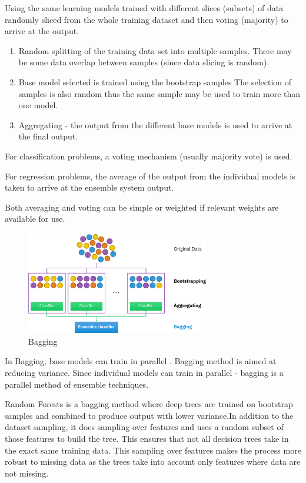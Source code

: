\documentclass{article}
\begin{document}
Using the same learning models trained with different slices (subsets) of data randomly sliced from the whole training dataset and then voting (majority) to arrive at the output.


\begin{enumerate}
    \item Random splitting of the training data set into multiple samples. 
    There may be some data overlap between samples (since data slicing is random).
    \item Base model selected is trained using the bootstrap samples
    The selection of samples is also random thus the same sample may be used to train more than one model.
    \item Aggregating - the output from the different base models is used to arrive at the final output.
\end{enumerate}

For classification problems, a voting mechanism (usually majority vote) is used. 

For regression problems, the average of the output from the individual models is taken to arrive at the ensemble system output.

Both averaging and voting can be simple or weighted if relevant weights are available for use. 



\begin{figure}[H]
    \centering
    \includegraphics[width=8cm]{report-imgs/Ensemble_Bagging.png}
    \caption{Bagging \cite{wiki:bagging}}
    \label{bagging}
\end{figure}

In Bagging, base models can train in parallel \cite{rocca_2021}. Bagging method is aimed at reducing variance. Since individual models can train in parallel - bagging is a parallel method of ensemble techniques.


Random Forests is a bagging method where deep trees are trained on bootstrap samples and combined to produce output with lower variance.In addition to the dataset sampling, it does sampling over features and uses a random subset of those features to build the tree. This ensures that not all decision trees take in the exact same training data. This sampling over features makes the process more robust to missing data as the trees take into account only features where data are not missing.
\end{document}
